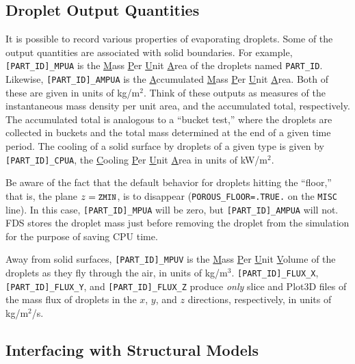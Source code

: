 \documentclass[11pt]{book}
\newcommand{\ct}{\tt\small}
\begin{document}
\subsection{Droplet Output Quantities}
\label{info:part_output}

It is possible to record various properties of evaporating droplets. Some of the output quantities are associated with solid boundaries. For example,
{\ct [PART\_ID]\_MPUA} is the \underline{M}ass \underline{P}er \underline{U}nit \underline{A}rea of the droplets named
{\ct PART\_ID}. Likewise, {\ct [PART\_ID]\_AMPUA} is the \underline{A}ccumulated \underline{M}ass \underline{P}er \underline{U}nit \underline{A}rea. Both of these
are given in units of kg/m$^2$. Think of these outputs as measures of the instantaneous mass density per unit area, and the accumulated total, respectively. The
accumulated total is analogous to a ``bucket test,'' where the droplets are collected in buckets and the total mass determined at the end of a given time
period. The cooling of a solid surface by droplets of a given type is given by {\ct [PART\_ID]\_CPUA}, the \underline{C}ooling \underline{P}er \underline{U}nit \underline{A}rea
in units of kW/m$^2$.

Be aware of the fact that the default behavior for droplets hitting the ``floor,'' that is, the plane $z=\hbox{\ct ZMIN}$, is to disappear ({\ct POROUS\_FLOOR=.TRUE.} on the
{\ct MISC} line). 
In this case, {\ct [PART\_ID]\_MPUA} will be zero, but {\ct [PART\_ID]\_AMPUA} will not. FDS stores the droplet mass just before removing the droplet from
the simulation for the purpose of saving CPU time.

Away from solid surfaces, {\ct [PART\_ID]\_MPUV} is the \underline{M}ass \underline{P}er \underline{U}nit \underline{V}olume of the droplets as they fly through
the air, in units of kg/m$^3$.  {\ct [PART\_ID]\_FLUX\_X},  {\ct [PART\_ID]\_FLUX\_Y}, and {\ct [PART\_ID]\_FLUX\_Z} produce {\em only} slice and Plot3D files
of the mass flux of droplets in the $x$, $y$, and $z$ directions, respectively, in units of kg/m$^2$/s.




\subsection{Interfacing with Structural Models}
\label{info:AST} 
\end{document}
